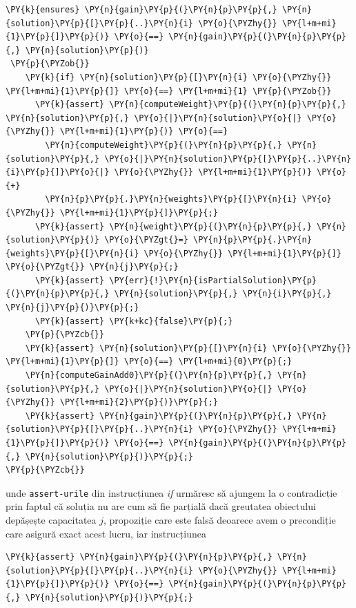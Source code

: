 \begin{sloppypar}
\begin{itemize}
\begin{Verbatim}[commandchars=\\\{\}]
 \PY{k}{ensures} \PY{n}{gain}\PY{p}{(}\PY{n}{p}\PY{p}{,} \PY{n}{solution}\PY{p}{[}\PY{p}{..}\PY{n}{i} \PY{o}{\PYZhy{}} \PY{l+m+mi}{1}\PY{p}{]}\PY{p}{)} \PY{o}{==} \PY{n}{gain}\PY{p}{(}\PY{n}{p}\PY{p}{,} \PY{n}{solution}\PY{p}{)}
 \PY{p}{\PYZob{}}
    \PY{k}{if} \PY{n}{solution}\PY{p}{[}\PY{n}{i} \PY{o}{\PYZhy{}} \PY{l+m+mi}{1}\PY{p}{]} \PY{o}{==} \PY{l+m+mi}{1} \PY{p}{\PYZob{}}
      \PY{k}{assert} \PY{n}{computeWeight}\PY{p}{(}\PY{n}{p}\PY{p}{,} \PY{n}{solution}\PY{p}{,} \PY{o}{|}\PY{n}{solution}\PY{o}{|} \PY{o}{\PYZhy{}} \PY{l+m+mi}{1}\PY{p}{)} \PY{o}{==} 
        \PY{n}{computeWeight}\PY{p}{(}\PY{n}{p}\PY{p}{,} \PY{n}{solution}\PY{p}{,} \PY{o}{|}\PY{n}{solution}\PY{p}{[}\PY{p}{..}\PY{n}{i}\PY{p}{]}\PY{o}{|} \PY{o}{\PYZhy{}} \PY{l+m+mi}{1}\PY{p}{)} \PY{o}{+} 
        \PY{n}{p}\PY{p}{.}\PY{n}{weights}\PY{p}{[}\PY{n}{i} \PY{o}{\PYZhy{}} \PY{l+m+mi}{1}\PY{p}{]}\PY{p}{;}
      \PY{k}{assert} \PY{n}{weight}\PY{p}{(}\PY{n}{p}\PY{p}{,} \PY{n}{solution}\PY{p}{)} \PY{o}{\PYZgt{}=} \PY{n}{p}\PY{p}{.}\PY{n}{weights}\PY{p}{[}\PY{n}{i} \PY{o}{\PYZhy{}} \PY{l+m+mi}{1}\PY{p}{]} \PY{o}{\PYZgt{}} \PY{n}{j}\PY{p}{;}
      \PY{k}{assert} \PY{err}{!}\PY{n}{isPartialSolution}\PY{p}{(}\PY{n}{p}\PY{p}{,} \PY{n}{solution}\PY{p}{,} \PY{n}{i}\PY{p}{,} \PY{n}{j}\PY{p}{)}\PY{p}{;}
      \PY{k}{assert} \PY{k+kc}{false}\PY{p}{;}
    \PY{p}{\PYZcb{}}
    \PY{k}{assert} \PY{n}{solution}\PY{p}{[}\PY{n}{i} \PY{o}{\PYZhy{}} \PY{l+m+mi}{1}\PY{p}{]} \PY{o}{==} \PY{l+m+mi}{0}\PY{p}{;}
    \PY{n}{computeGainAdd0}\PY{p}{(}\PY{n}{p}\PY{p}{,} \PY{n}{solution}\PY{p}{,} \PY{o}{|}\PY{n}{solution}\PY{o}{|} \PY{o}{\PYZhy{}} \PY{l+m+mi}{2}\PY{p}{)}\PY{p}{;}
    \PY{k}{assert} \PY{n}{gain}\PY{p}{(}\PY{n}{p}\PY{p}{,} \PY{n}{solution}\PY{p}{[}\PY{p}{..}\PY{n}{i} \PY{o}{\PYZhy{}} \PY{l+m+mi}{1}\PY{p}{]}\PY{p}{)} \PY{o}{==} \PY{n}{gain}\PY{p}{(}\PY{n}{p}\PY{p}{,} \PY{n}{solution}\PY{p}{)}\PY{p}{;}
\PY{p}{\PYZcb{}}
\end{Verbatim}
    unde \texttt{assert-urile} din instrucțiunea \textit{if} urmăresc să ajungem la o contradicție prin faptul că soluția nu are cum să fie parțială dacă greutatea obiectului depășește capacitatea $j$, propoziție care este falsă deoarece avem o precondiție care asigură exact acest lucru, iar instrucțiunea 
    \begin{Verbatim}[commandchars=\\\{\}]
\PY{k}{assert} \PY{n}{gain}\PY{p}{(}\PY{n}{p}\PY{p}{,} \PY{n}{solution}\PY{p}{[}\PY{p}{..}\PY{n}{i} \PY{o}{\PYZhy{}} \PY{l+m+mi}{1}\PY{p}{]}\PY{p}{)} \PY{o}{==} \PY{n}{gain}\PY{p}{(}\PY{n}{p}\PY{p}{,} \PY{n}{solution}\PY{p}{)}\PY{p}{;}

\end{Verbatim}
\end{itemize}
\end{sloppypar}
